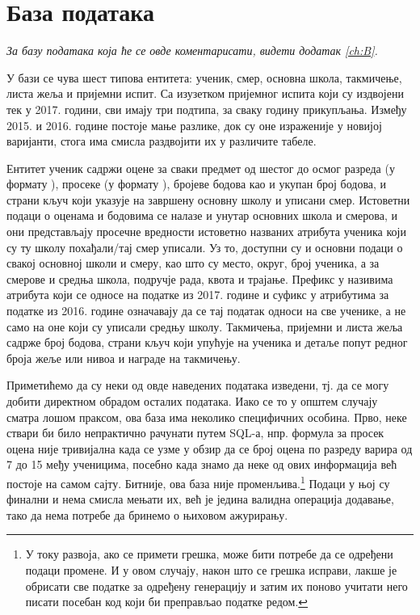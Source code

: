 \section{База података}
\vspace*{-7mm}
\emph{За базу података која ће се овде коментарисати, видети додатак \ref{ch:B}.} %

У бази се чува шест типова ентитета: ученик, смер, основна школа, такмичење, листа жеља и пријемни испит. Са изузетком пријемног испита који су издвојени тек у 2017. години, сви имају три подтипа, за сваку годину прикупљања. Између 2015. и 2016. године постоје мање разлике, док су оне израженије у новијој варијанти, стога има смисла раздвојити их у различите табеле. 

Ентитет ученик садржи оцене за сваки предмет од шестог до осмог разреда (у формату ), просеке (у формату ), бројеве бодова као и укупан број бодова, и страни кључ који указује на завршену основну школу и уписани смер. Истоветни подаци о оценама и бодовима се налазе и унутар основних школа и смерова, и они представљају просечне вредности истоветно названих атрибута ученика који су ту школу похађали/тај смер уписали. Уз то, доступни су и основни подаци о свакој основној школи и смеру, као што су место, округ, број ученика, а за смерове и средња школа, подручје рада, квота и трајање. Префикс  у називима атрибута који се односе на податке из 2017. године и суфикс  у атрибутима за податке из 2016. године означавају да се тај податак односи на све ученике, а не само на оне који су уписали средњу школу. Такмичења, пријемни и листа жеља садрже број бодова, страни кључ који упућује на ученика и детаље попут редног броја жеље или нивоа и награде на такмичењу.

Приметићемо да су неки од овде наведених података изведени, тј. да се могу добити директном обрадом осталих података. Иако се то у општем случају сматра лошом праксом, ова база има неколико специфичних особина. Прво, неке ствари би било непрактично рачунати путем SQL-а, нпр. формула за просек оцена није тривијална када се узме у обзир да се број оцена по разреду варира од 7 до 15 међу ученицима, посебно када знамо да неке од ових информација већ постоје на самом сајту. Битније, ова база није променљива.\footnote{У току развоја, ако се примети грешка, може бити потребе да се одређени подаци промене. И у овом случају, након што се грешка исправи, лакше је обрисати све податке за одређену генерацију и затим их поново учитати него писати посебан код који би преправљао податке редом.} Подаци у њој су финални и нема смисла мењати их, већ је једина валидна операција додавање, тако да нема потребе да бринемо о њиховом ажурирању.



